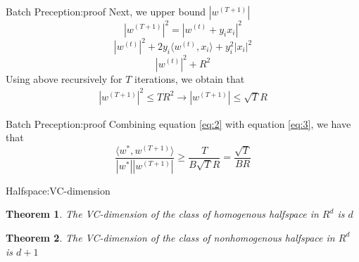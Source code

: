 \documentclass{beamer}
\newtheorem{thm}{Theorem}[subsection]
\begin{document}
\begin{frame}{Batch Preception:proof}
	Next, we upper bound $|w^{(T+1)}|$
	\[|w^{(T+1)}|^2 = |w^{(t)} + y_ix_i|^2\]
	\[|w^{(t)}|^2 + 2y_i \langle w^{(t)}, x_i \rangle + y^2_i |x_i|^2\]
	\[|w^{(t)}|^2 + R^2\]
	Using above recursively for $T$ iterations, we obtain that
	\begin{align}
		|w^{(T+1)}|^2 \leq TR^2 \rightarrow |w^{(T+1)}| \leq \sqrt{T} R \label{eq:3}
	\end{align}
\end{frame}
\begin{frame}{Batch Preception:proof}
	Combining equation \ref{eq:2} with equation \ref{eq:3}, we have that 
	\[\frac{\langle w^*, w^{(T+1)} \rangle}{|w^*| |w^{(T+1)}|} \geq \frac{T}{B \sqrt{T} R} = \frac{\sqrt{T}}{BR}\]
\end{frame}
\begin{frame}{Halfspace:VC-dimension}
	\begin{thm}
		The VC-dimension of the class of homogenous halfspace  in $R^d$ is $d$
	\end{thm}
	\begin{thm}
		The VC-dimension of the class of nonhomogenous halfspace in $R^d$ is $d+1$
	\end{thm}
\end{frame}
\end{document}
